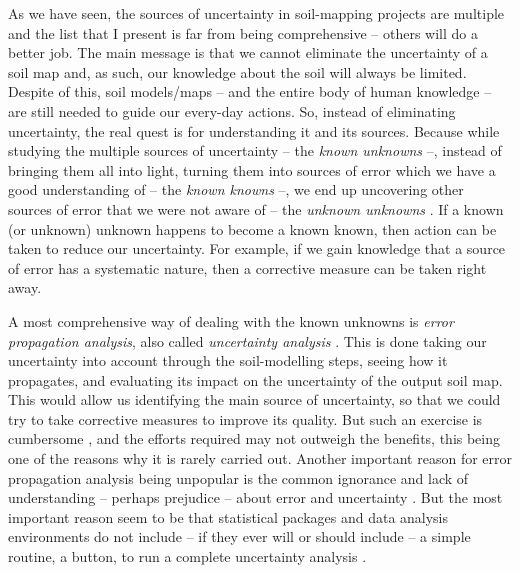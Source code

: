 As we have seen, the sources of uncertainty in soil-mapping projects are multiple and the list that I
present is far from being comprehensive -- others will do a better job. The main message is that we 
cannot eliminate the uncertainty of a soil map and, as such, our knowledge about the soil will always 
be limited. Despite of this, soil models/maps -- and the entire body of human knowledge -- are still 
needed to guide our every-day actions. So, instead of eliminating uncertainty, the real quest is for 
understanding it and its sources. Because while studying the multiple sources of uncertainty -- the 
\emph{known unknowns} --, instead of bringing them all into light, turning them into sources of error 
which we have a good understanding of -- the \emph{known knowns} --, we end up uncovering other sources
of error that we were not aware of -- the \emph{unknown unknowns} \cite{Wikipedia2015}. If a known 
(or unknown) unknown happens to become a known known, then action can be taken to reduce our 
uncertainty. For example, if we gain knowledge that a source of error has a systematic nature, then a
corrective measure can be taken right away.

A most comprehensive way of dealing with the known unknowns is \emph{error propagation analysis}, 
also called \emph{uncertainty analysis} \cite{HeuvelinkEtAl1989,Taylor1997}. This is done taking
our uncertainty into account through the soil-modelling steps, seeing how it propagates, and 
evaluating its impact on the uncertainty of the output soil map. This would allow us identifying the
main source of uncertainty, so that we could try to take corrective measures to improve its quality.
But such an exercise is cumbersome \cite{NelsonEtAl2011}, and the efforts required may not
outweigh the benefits, this being one of the reasons why it is rarely carried out. Another important 
reason for error propagation analysis being unpopular is the common ignorance and lack of 
understanding -- perhaps prejudice -- about error and uncertainty \cite{Wechsler2003,Heuvelink2005}.
But the most important reason seem to be that statistical packages and data analysis environments do 
not include -- if they ever will or should include -- a simple routine, a button, to run a complete 
uncertainty analysis \cite{HeuvelinkEtAl2006b}.

